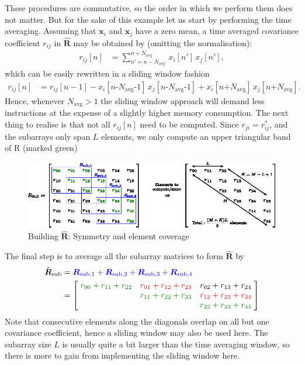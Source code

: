 \documentclass[12pt,journal,captionsoff,onecolumn]{IEEEtran}
\let\MYoriglatexcaption\caption               %
\renewcommand{\caption}[2][\relax]{\MYoriglatexcaption[#2]{#2}}
\newenvironment{narrow}[2]{%
\begin{list}{}{%
\setlength{\topsep}{0pt}%
\setlength{\leftmargin}{#1}%
\setlength{\rightmargin}{#2}%
\setlength{\listparindent}{\parindent}%
\setlength{\itemindent}{\parindent}%
\setlength{\parsep}{\parskip}}%
\item[]}{\end{list}}
\newcommand\Green[1]{{\color{Green}#1}}
\newcommand\sumb[2]{\sum\limits_{#1}^{#2}\,}
\renewcommand\vec[1]{\boldsymbol{#1}}
\newcommand\mat[1]{\boldsymbol{#1}}
\newcommand\1{\vec 1}
\begin{document}
These procedures are commutative, so the order in which we perform them does not matter. But for the sake of this example let us start by performing the time averaging. Assuming that $\vec x_i$ and $\vec x_j$ have a zero mean, a time averaged covariance coefficient $r_{ij}$ in $\hat{\mat R}$ may be obtained by (omitting the normalisation):
\begin{align*}
r_{ij}[n] &= \sumb{n'=n-N_{\text{avg}}}{n+N_{\text{avg}}} x_i[n']\,x_j[n'],
\end{align*}
which can be easily rewritten in a sliding window fashion
\begin{align*}
r_{ij}[n] &= r_{ij}[n-1] - x_i[n\text{-}N_\text{avg}\text{-}1]\,x_j[n\text{-}N_\text{avg}\text{-}1]
                         + x_i[n\text{+}N_\text{avg}]\,x_j[n\text{+}N_\text{avg}].
\end{align*}
Hence, whenever $N_\text{avg}>1$ the sliding window approach will demand less instructions at the expense of a slightly higher memory consumption. The next thing to realise is that not all $r_{ij}[n]$ need to be computed. Since $r_{ji} = r^*_{ij}$, and the subarrays only span $L$ elements, we only compute an upper triangular band of R (marked \Green{green})
\begin{figure}[H]
\includegraphics[width=\linewidth]{gfx/capon_build_R_full.eps}
\caption{Building $\hat{\mat R}$: Symmetry and element coverage}\label{buildingRfull}
\end{figure}
The final step is to average all the subarray matrices to form $\hat{\mat R}$ by 
{\renewcommand*{\arraystretch}{1.8}
\begin{align*}
\hat{\mat R}_\text{sub} &= {\color{Blue}\mat R_{\text{sub},1} + \mat R_{\text{sub},2} + \mat R_{\text{sub},3} + \mat R_{\text{sub},4}} \\
&= \left[\;
\begin{matrix}
\color{Green}r_{00}+r_{11}+r_{22} & \color{Red}r_{01}+r_{12}+r_{23} & r_{02}+r_{13}+r_{24} \\
                                       & \color{Green}r_{11}+r_{22}+r_{33} & \color{Red}r_{12}+r_{23}+r_{34} \\
                                       &                                        & \color{Green}r_{22}+r_{33}+r_{44}
\end{matrix}
\;\right]
\end{align*}}%
Note that consecutive elements along the diagonals overlap on all but one covariance coefficient, hence a sliding window may also be used here. The subarray size $L$ is usually quite a bit larger than the time averaging window, so there is more to gain from implementing the sliding window here.\\\\
\end{document}
